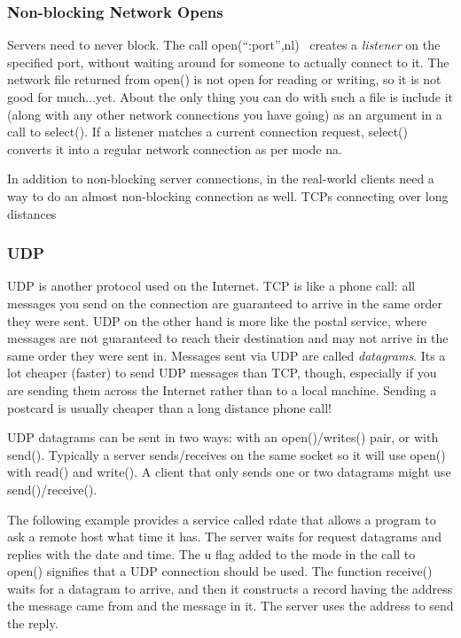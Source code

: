 \subsubsection[Non{}-blocking Network Opens]{\sffamily Non-blocking
Network Opens}
Servers need to never block. The call
\textsf{open({\textquotedblleft}:port{\textquotedblright},{\textquotedbl}nl{\textquotedbl})}
\ creates a \textit{listener} on the specified port, without waiting
around for someone to actually connect to it. The network file returned
from \textsf{open()} is not open for reading or writing, so it is not
good for much...yet. About the only thing you can do with such a file
is include it (along with any other network connections you have going)
as an argument in a call to \textsf{select()}. If a listener matches a
current connection request, \textsf{select()} converts it into a
regular network connection as per mode
\textsf{{\textquotedbl}na{\textquotedbl}}.

In addition to non-blocking server connections, in the real-world
clients need a way to do an almost non-blocking connection as well.
TCP{\textquotesingle}s connecting over long distances

\subsubsection{UDP}

UDP is another protocol used on the Internet. TCP is like a
phone call: all messages you send on the connection are guaranteed to
arrive in the same order they were sent. UDP on the other hand is more
like the postal service, where messages are not guaranteed to reach
their destination and may not arrive in the same order they were sent
in. Messages sent via UDP are called \textit{datagrams}.
It{\textquotesingle}s a lot cheaper (faster) to send UDP messages than
TCP, though, especially if you are sending them across the Internet
rather than to a local machine. Sending a postcard is usually cheaper
than a long distance phone call!

UDP datagrams can be sent in two ways: with an \textsf{open()/writes()}
pair, or with \textsf{send()}. Typically a server sends/receives on the
same socket so it will use \textsf{open()} with \textsf{read()} and
\textsf{write()}. A client that only sends one or two datagrams might
use
\textsf{send()}\textsf{/}\textsf{receive()}.

The following example provides a service called
{\textquotedbl}rdate{\textquotedbl} that allows a program to ask a
remote host what time it has. The server waits for request datagrams
and replies with the date and time. The
\textsf{{\textquotedbl}u{\textquotedbl}} flag added to the mode in the
call to \textsf{open()} signifies that a UDP connection should be used.
The function \textsf{receive()} waits for a datagram to arrive, and
then it constructs a record having the address the message came from
and the message in it. The server uses the address to send the reply.

